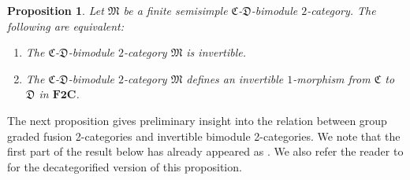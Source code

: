 \documentclass[10pt,a4paper]{amsart}
\newtheorem{Proposition}[Theorem]{Proposition}
{ \theoremstyle{definition}
\newtheorem{Definition}[Theorem]{Definition}
\newtheorem{Note}[Theorem]{Note}
\newtheorem{Construction}[Theorem]{Construction}
\newtheorem{Example}[Theorem]{Example}
\newtheorem{Remark}[Theorem]{Remark} }
\numberwithin{equation}{section}
\begin{document}
\begin{Proposition}\label{prop:invertibilitycharacterization}
Let $\mathfrak{M}$ be a finite semisimple $\mathfrak{C}$-$\mathfrak{D}$-bimodule $2$-category. The following are equivalent:
\begin{enumerate}\itemsep=0pt
 \item[$(1)$] The $\mathfrak{C}$-$\mathfrak{D}$-bimodule $2$-category $\mathfrak{M}$ is invertible.
 \item[$(2)$] The $\mathfrak{C}$-$\mathfrak{D}$-bimodule $2$-category $\mathfrak{M}$ defines an invertible $1$-morphism from $\mathfrak{C}$ to $\mathfrak{D}$ in $\mathbf{F2C}$.
\end{enumerate}
\end{Proposition}

The next proposition gives preliminary insight into the relation between group graded fusion 2-categories and invertible bimodule 2-categories. We note that the first part of the result below has already appeared as \cite[Proposition~3.1.7]{DY23}. We also refer the reader to \cite[Theorem~6.1]{ENO2} for the decategorified version of this proposition.
\end{document}
